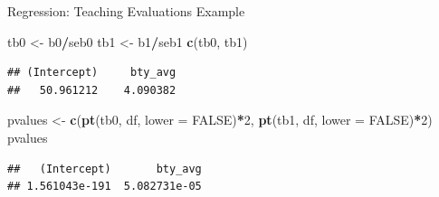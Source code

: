 \documentclass[
  ignorenonframetext,
]{beamer}
\newenvironment{Shaded}{\begin{snugshade}}{\end{snugshade}}
\newcommand{\AttributeTok}[1]{\textcolor[rgb]{0.13,0.29,0.53}{#1}}
\newcommand{\ConstantTok}[1]{\textcolor[rgb]{0.56,0.35,0.01}{#1}}
\newcommand{\DecValTok}[1]{\textcolor[rgb]{0.00,0.00,0.81}{#1}}
\newcommand{\FunctionTok}[1]{\textcolor[rgb]{0.13,0.29,0.53}{\textbf{#1}}}
\newcommand{\NormalTok}[1]{#1}
\newcommand{\OtherTok}[1]{\textcolor[rgb]{0.56,0.35,0.01}{#1}}
\newcommand{\SpecialCharTok}[1]{\textcolor[rgb]{0.81,0.36,0.00}{\textbf{#1}}}
\begin{document}
\begin{frame}[fragile]{Regression: Teaching Evaluations Example}
\protect\hypertarget{regression-teaching-evaluations-example-9}{}
\tiny

\begin{Shaded}
\begin{Highlighting}[]
\NormalTok{tb0 }\OtherTok{\textless{}{-}}\NormalTok{ b0}\SpecialCharTok{/}\NormalTok{seb0}
\NormalTok{tb1 }\OtherTok{\textless{}{-}}\NormalTok{ b1}\SpecialCharTok{/}\NormalTok{seb1}
\FunctionTok{c}\NormalTok{(tb0, tb1)}
\end{Highlighting}
\end{Shaded}

\begin{verbatim}
## (Intercept)     bty_avg 
##   50.961212    4.090382
\end{verbatim}

\begin{Shaded}
\begin{Highlighting}[]
\NormalTok{pvalues }\OtherTok{\textless{}{-}} \FunctionTok{c}\NormalTok{(}\FunctionTok{pt}\NormalTok{(tb0, df, }\AttributeTok{lower =} \ConstantTok{FALSE}\NormalTok{)}\SpecialCharTok{*}\DecValTok{2}\NormalTok{, }\FunctionTok{pt}\NormalTok{(tb1, df, }\AttributeTok{lower =} \ConstantTok{FALSE}\NormalTok{)}\SpecialCharTok{*}\DecValTok{2}\NormalTok{)}
\NormalTok{pvalues}
\end{Highlighting}
\end{Shaded}

\begin{verbatim}
##   (Intercept)       bty_avg 
## 1.561043e-191  5.082731e-05
\end{verbatim}

\normalsize
\end{frame}
\end{document}
